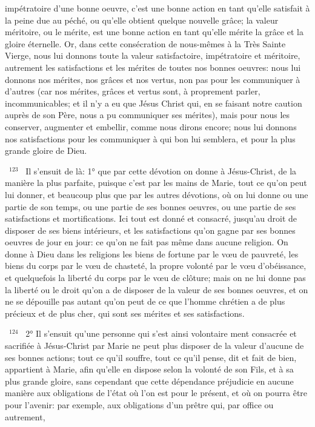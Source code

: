 \documentclass[paper=a5,pagesize=pdftex,fontsize=15pt,headinclude=on,twoside=off]{scrbook}
\newcommand{\negphantom}[1]{\settowidth{\dimen0}{#1}\hspace*{-\dimen0}}
\newcommand{\versenb}[1]{\par \vspace{10pt}~\negphantom{~${}^{#1}$~}${}^{#1}$~}
\begin{document}
impétratoire d'une bonne oeuvre, c'est une bonne action en tant qu'elle satisfait à la peine due au péché, ou qu'elle
obtient quelque nouvelle grâce; la valeur méritoire, ou le mérite, est une bonne action en tant qu'elle mérite la
grâce et la gloire éternelle. Or, dans cette consécration de nous-mêmes à la Très Sainte Vierge, nous lui donnons
toute la valeur satisfactoire, impétratoire et méritoire, autrement les satisfactions et les mérites de toutes nos
bonnes oeuvres: nous lui donnons nos mérites, nos grâces et nos vertus, non pas pour les communiquer à
d'autres (car nos mérites, grâces et vertus sont, à proprement parler, incommunicables; et il n'y a eu que Jésus Christ qui, en se faisant notre caution auprès de son Père, nous a pu communiquer ses mérites), mais pour nous
les conserver, augmenter et embellir, comme nous dirons encore; nous lui donnons nos satisfactions pour les
communiquer à qui bon lui semblera, et pour la plus grande gloire de Dieu.
\versenb{123} Il s'ensuit de là: 1° que par cette dévotion on donne à Jésus-Christ, de la manière la plus parfaite, puisque
c'est par les mains de Marie, tout ce qu'on peut lui donner, et beaucoup plus que par les autres dévotions, où on lui
donne ou une partie de son temps, ou une partie de ses bonnes oeuvres, ou une partie de ses satisfactions et
mortifications. Ici tout est donné et consacré, jusqu'au droit de disposer de ses biens intérieurs, et les satisfactions
qu'on gagne par ses bonnes oeuvres de jour en jour: ce qu'on ne fait pas même dans aucune religion. On donne à
Dieu dans les religions les biens de fortune par le vœu de pauvreté, les biens du corps par le vœu de chasteté, la
propre volonté par le vœu d'obéissance, et quelquefois la liberté du corps par le vœu de clôture; mais on ne lui
donne pas la liberté ou le droit qu'on a de disposer de la valeur de ses bonnes oeuvres, et on ne se dépouille pas
autant qu'on peut de ce que l'homme chrétien a de plus précieux et de plus cher, qui sont ses mérites et ses
satisfactions.
\versenb{124} 2° Il s'ensuit qu'une personne qui s'est ainsi volontaire ment consacrée et sacrifiée à Jésus-Christ par Marie
ne peut plus disposer de la valeur d'aucune de ses bonnes actions; tout ce qu'il souffre, tout ce qu'il pense, dit et
fait de bien, appartient à Marie, afin qu'elle en dispose selon la volonté de son Fils, et à sa plus grande gloire, sans
cependant que cette dépendance préjudicie en aucune manière aux obligations de l'état où l'on est pour le
présent, et où on pourra être pour l'avenir: par exemple, aux obligations d'un prêtre qui, par office ou autrement,
\end{document}
